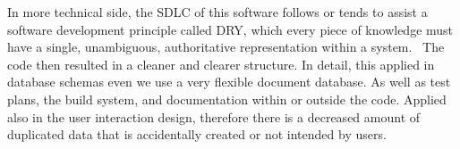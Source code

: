 In more technical side, the \ac{SDLC} of this software follows or tends to assist a software development principle called \ac{DRY},
which every piece of knowledge must have a single, unambiguous, authoritative representation within a system.~\autocite{Hunt1999Pragmatic}
The code then resulted in a cleaner and clearer structure.
In detail, this applied in database schemas even we use a very flexible document database.
As well as test plans, the build system, and documentation within or outside the code.
Applied also in the user interaction design, therefore there is a decreased amount of duplicated data that is accidentally created or not intended by users.
